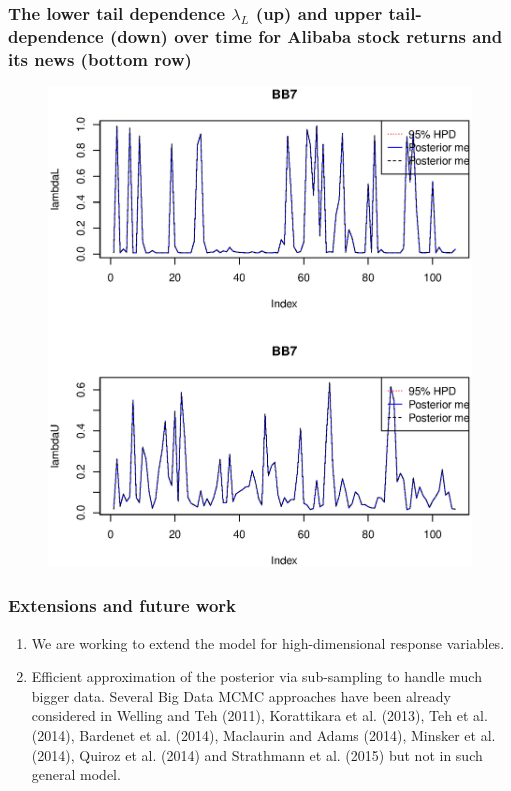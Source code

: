 \documentclass{beamer}
\begin{document}
\begin{frame}
  \frametitle{The lower tail dependence $\lambda_L$ (up) and upper tail-dependence (down) over
    time for Alibaba stock returns and its news (bottom row)}
  \begin{figure}
    \centering
    \includegraphics[height=0.9\textheight]{plot/lambdaLU}\\
  \end{figure}
\end{frame}


\begin{frame}
  \frametitle{Extensions and future work}
  \begin{enumerate}
  \item We are working to extend the model for high-dimensional response variables.

  \item Efficient approximation of the posterior via sub-sampling to handle much bigger
    data. Several Big Data MCMC approaches have been already considered in
    {\color{blue}Welling and Teh (2011), Korattikara et al. (2013), Teh et al. (2014),
      Bardenet et al. (2014), Maclaurin and Adams (2014), Minsker et al.  (2014), Quiroz
      et al. (2014)} and {\color{blue}Strathmann et al. (2015)} but not in such general
    model.

  \end{enumerate}
\end{frame}
\end{document}
